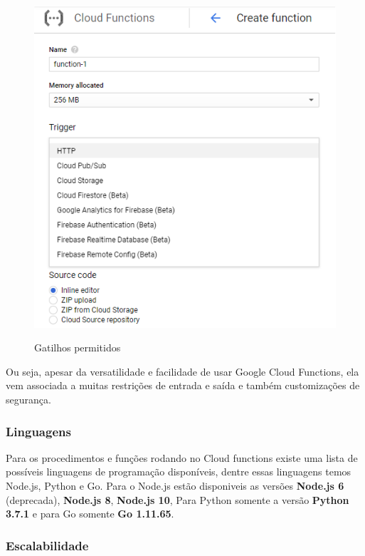 \begin{figure}[ht]
	\centering
	\caption{Gatilhos permitidos}
	\includegraphics[width=12.5cm]{figuras/google-cloud-functions/triggers.png}
	\label{fig:google-cloud-functions-triggers}
\end{figure}


\bigskip
Ou seja, apesar da versatilidade e facilidade de usar Google Cloud Functions, ela vem associada a muitas restrições de entrada e saída e também customizações de segurança.

\subsubsection{Linguagens}

Para os procedimentos e funções rodando no Cloud functions existe uma lista de possíveis linguagens de programação disponíveis, dentre essas linguagens temos Node.js, Python e Go.
Para o Node.js estão disponiveis as versões \textbf{Node.js 6} (deprecada), \textbf{Node.js 8}, \textbf{Node.js 10}, Para Python somente a versão \textbf{Python 3.7.1} e para Go somente \textbf{Go 1.11.65}.

\subsubsection{Escalabilidade}


